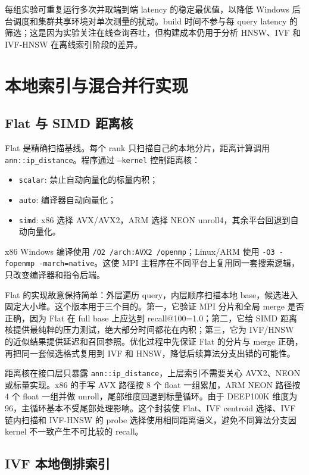 \documentclass[11pt,a4paper]{article}
\begin{document}
每组实验可重复运行多次并取端到端 latency 的稳定最优值，以降低 Windows 后台调度和集群共享环境对单次测量的扰动。build 时间不参与每 query latency 的筛选；这是因为实验关注在线查询吞吐，但构建成本仍用于分析 HNSW、IVF 和 IVF-HNSW 在离线索引阶段的差异。

\section{本地索引与混合并行实现}

\subsection{Flat 与 SIMD 距离核}

Flat 是精确扫描基线。每个 rank 只扫描自己的本地分片，距离计算调用 \texttt{ann::ip\_distance}。程序通过 \texttt{--kernel} 控制距离核：
\begin{itemize}
    \item \texttt{scalar}: 禁止自动向量化的标量内积；
    \item \texttt{auto}: 编译器自动向量化；
    \item \texttt{simd}: x86 选择 AVX/AVX2，ARM 选择 NEON unroll4，其余平台回退到自动向量化。
\end{itemize}
x86 Windows 编译使用 \texttt{/O2 /arch:AVX2 /openmp}；Linux/ARM 使用 \texttt{-O3 -fopenmp -march=native}。这使 MPI 主程序在不同平台上复用同一套搜索逻辑，只改变编译器和指令后端。

Flat 的实现故意保持简单：外层遍历 query，内层顺序扫描本地 base，候选进入固定大小堆。这个版本用于三个目的。第一，它验证 MPI 分片和全局 merge 是否正确，因为 Flat 在 full base 上应达到 recall@100=1.0；第二，它给 SIMD 距离核提供最纯粹的压力测试，绝大部分时间都花在内积；第三，它为 IVF/HNSW 的近似结果提供延迟和召回参照。优化过程中先保证 Flat 的分片与 merge 正确，再把同一套候选格式复用到 IVF 和 HNSW，降低后续算法分支出错的可能性。

距离核在接口层只暴露 \texttt{ann::ip\_distance}，上层索引不需要关心 AVX2、NEON 或标量实现。x86 的手写 AVX 路径按 8 个 float 一组累加，ARM NEON 路径按 4 个 float 一组并做 unroll，尾部维度回退到标量循环。由于 DEEP100K 维度为 96，主循环基本不受尾部处理影响。这个封装使 Flat、IVF centroid 选择、IVF 链内扫描和 IVF-HNSW 的 probe 选择使用相同距离语义，避免不同算法分支因 kernel 不一致产生不可比较的 recall。

\subsection{IVF 本地倒排索引}
\end{document}
